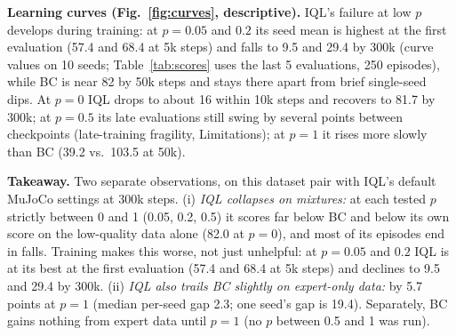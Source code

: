 \documentclass{article}
\begin{document}
\textbf{Learning curves (Fig.~\ref{fig:curves}, descriptive).} IQL's failure at low $p$ develops during training: at $p=0.05$ and $0.2$ its seed mean is highest at the first evaluation (57.4 and 68.4 at 5k steps) and falls to 9.5 and 29.4 by 300k (curve values on 10 seeds; Table~\ref{tab:scores} uses the last 5 evaluations, 250 episodes), while BC is near 82 by 50k steps and stays there apart from brief single-seed dips. At $p=0$ IQL drops to about 16 within 10k steps and recovers to 81.7 by 300k; at $p=0.5$ its late evaluations still swing by several points between checkpoints (late-training fragility, Limitations); at $p=1$ it rises more slowly than BC (39.2 vs.\ 103.5 at 50k).

\textbf{Takeaway.} Two separate observations, on this dataset pair with IQL's default MuJoCo settings at 300k steps. (i) \emph{IQL collapses on mixtures:} at each tested $p$ strictly between 0 and 1 (0.05, 0.2, 0.5) it scores far below BC and below its own score on the low-quality data alone (82.0 at $p=0$), and most of its episodes end in falls. Training makes this worse, not just unhelpful: at $p=0.05$ and $0.2$ IQL is at its best at the first evaluation (57.4 and 68.4 at 5k steps) and declines to 9.5 and 29.4 by 300k. (ii) \emph{IQL also trails BC slightly on expert-only data:} by 5.7 points at $p=1$ (median per-seed gap 2.3; one seed's gap is 19.4). Separately, BC gains nothing from expert data until $p=1$ (no $p$ between 0.5 and 1 was run).
\end{document}

